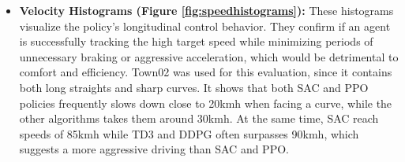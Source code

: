 \documentclass[sn-mathphys,Numbered]{sn-jnl}
\begin{document}
\begin{itemize}

    \item \textbf{Velocity Histograms (Figure \ref{fig:speedhistograms}):} These histograms visualize the policy's longitudinal control behavior. They confirm if an agent is successfully tracking the high target speed while minimizing periods of unnecessary braking or aggressive acceleration, which would be detrimental to comfort and efficiency. Town02 was used for this evaluation, since it contains both long straights and sharp curves.
    It shows that both SAC and PPO policies frequently slows down close to 20kmh when facing a curve, while the other algorithms takes them around 30kmh. At the same time, SAC reach speeds of 85kmh while TD3 and DDPG often surpasses 90kmh, which suggests a more aggressive driving than SAC and PPO.


\end{itemize}
\end{document}
